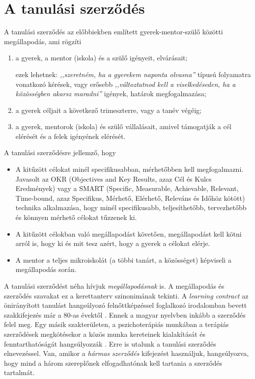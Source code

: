 \section{A tanulási szerződés}

A tanulási szerződés az előbbiekben említett gyerek-mentor-szülő közötti megállapodás, ami rögzíti
\begin{enumerate}
      \item a gyerek, a mentor (iskola) és a szülő igényeit, elvárásait;

            ezek lehetnek: \emph{,,szeretném, ha a gyerekem naponta olvasna''} típusú folyamatra vonatkozó kérések, vagy erősebb \emph{,,változtatnod       kell a viselkedéseden, ha a közösségben akarsz maradni''} igények, határok megfogalmazása;

      \item a gyerek céljait a következő trimeszterre, vagy a tanév végéig;

      \item a gyerek, mentorok (iskola) és szülő vállalásait, amivel támogatják a cél elérését és a felek igényének elérését.

\end{enumerate}

A tanulási szerződésre jellemző, hogy
\begin{itemize}
      \item A kitűzött célokat minél specifikusabban, mérhetőbben kell megfogalmazni. Javasolt az OKR  (Objectives and Key Results, azaz	Cél és Kulcs Eredmények) \citep{okr} vagy a SMART (Specific, Measurable, Achievable, Relevant, Time-bound, azaz Specifikus,  Mérhető, Elérhető, Releváns és Időhöz kötött) \citep{wiki:smart} technika alkalmazása, hogy minél specifikusabb, teljesíthetőbb, tervezhetőbb és könnyen mérhető célokat tűzzenek ki.

      \item A kitűzött célokban való megállapodást követően, megállapodást kell kötni arról is, hogy ki és mit tesz azért, hogy a gyerek a célokat elérje.

      \item A mentor a teljes mikroiskolát (a többi tanárt, a közösséget) képviseli a megállapodás során.
\end{itemize}

A tanulási szerződést néha hívjuk \emph{megállapodásnak} is. A megállapodás és szerződés szavakat ez a kerettanterv szinonimának tekinti. A \emph{learn\-ing con\-tract} az önirányított tanulást hangsúlyozó felnőttképzéssel foglalkozó irodalomban bevett szakkifejezés már a 80-as évektől \citep{Malcolm77}. Ennek a magyar nyelvben inkább a szerződés felel meg. Egy másik szakterületen, a pszichoterápiás munkában a terápiás szerződések megkötésekor a közös munka kereteinek kialakítását és fenntarthatóságát hangsúlyozzák \citep{pszichoterapia}. Erre is utalunk a tanulási szerződés elnevezéssel. Van, amikor a \emph{hármas szerződés} kifejezést használjuk, hangsúlyozva, hogy mind a három szereplőnek elfogadhatónak kell tartania a szerződés tartalmát.
